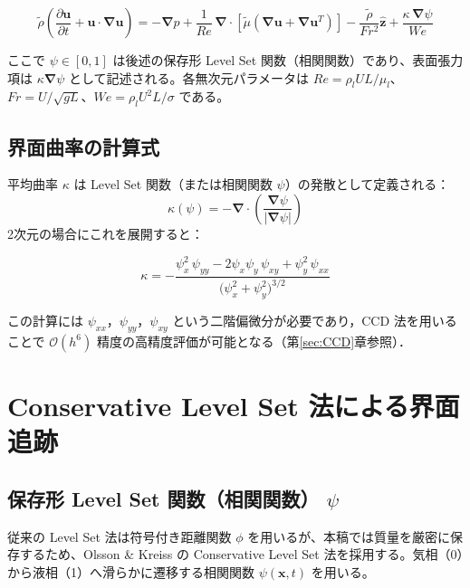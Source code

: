 \documentclass[12pt, a4paper, titlepage, xelatex, ja=standard]{bxjsarticle}
\newcommand{\pd}[2]{\dfrac{\partial #1}{\partial #2}}
\newcommand{\bu}{\bm{u}}
\newcommand{\bnabla}{\bm{\nabla}}
\newcommand{\Ord}[1]{\mathcal{O}(#1)}
\begin{document}
\begin{tcolorbox}[mybox, title={無次元 Navier--Stokes 方程式}]
\begin{equation}
  \tilde{\rho}\!\left(\pd{\bu}{t} + \bu\cdot\bnabla\bu\right)
  = -\bnabla p
  + \frac{1}{Re}\,\bnabla\cdot\!\left[\tilde{\mu}\!\left(\bnabla\bu + \bnabla\bu^T\right)\right]
  - \frac{\tilde{\rho}}{Fr^2}\hat{\bm{z}}
  + \frac{\kappa\,\bnabla\psi}{We}
  \label{eq:NS_dimless}
\end{equation}
\end{tcolorbox}
ここで $\psi \in [0,1]$ は後述の保存形 Level Set 関数（相関関数）であり、表面張力項は $\kappa \bnabla\psi$ として記述される。各無次元パラメータは $Re = \rho_l U L / \mu_l$、$Fr = U / \sqrt{gL}$、$We = \rho_l U^2 L / \sigma$ である。

\subsection{界面曲率の計算式}

平均曲率 $\kappa$ は Level Set 関数（または相関関数 $\psi$）の発散として定義される：
\begin{equation}
  \kappa(\psi) = -\bnabla\cdot\!\left(\frac{\bnabla\psi}{|\bnabla\psi|}\right)
  \label{eq:curvature_def}
\end{equation}
2次元の場合にこれを展開すると：
\begin{tcolorbox}[mybox, title={2次元界面曲率（展開形）}]
\begin{equation}
  \kappa = -\frac{
    \psi_x^2\,\psi_{yy}
    - 2\psi_x\psi_y\,\psi_{xy}
    + \psi_y^2\,\psi_{xx}
  }{\bigl(\psi_x^2 + \psi_y^2\bigr)^{3/2}}
  \label{eq:curvature_2d}
\end{equation}
\end{tcolorbox}
この計算には $\psi_{xx}$，$\psi_{yy}$，$\psi_{xy}$ という二階偏微分が必要であり，CCD 法を用いることで $\Ord{h^6}$ 精度の高精度評価が可能となる（第\ref{sec:CCD}章参照）．


\section{Conservative Level Set 法による界面追跡}
\label{sec:levelset}

\subsection{保存形 Level Set 関数（相関関数） $\psi$}
従来の Level Set 法は符号付き距離関数 $\phi$ を用いるが、本稿では質量を厳密に保存するため、Olsson \& Kreiss \cite{OlssonKreiss2005} の Conservative Level Set 法を採用する。気相（0）から液相（1）へ滑らかに遷移する相関関数 $\psi(\bm{x}, t)$ を用いる。
\end{document}
